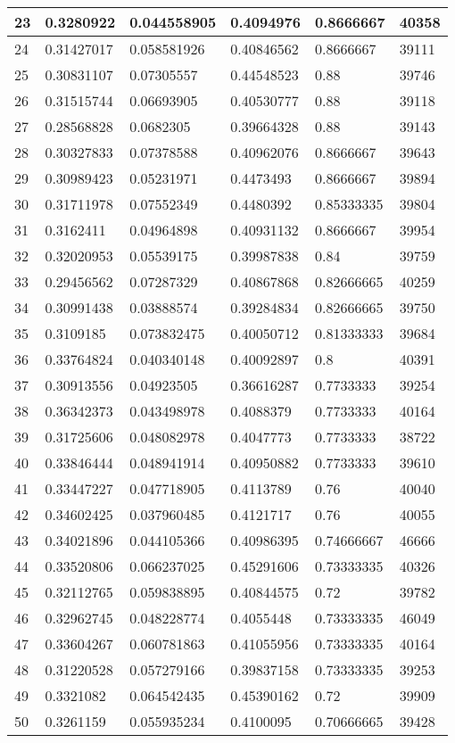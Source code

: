 \begin{longtable}{|l|l|l|l|l|l|}
23 & 0.3280922 & 0.044558905 & 0.4094976 & 0.8666667 & 40358 \\ \hline 
24 & 0.31427017 & 0.058581926 & 0.40846562 & 0.8666667 & 39111 \\ \hline 
25 & 0.30831107 & 0.07305557 & 0.44548523 & 0.88 & 39746 \\ \hline 
26 & 0.31515744 & 0.06693905 & 0.40530777 & 0.88 & 39118 \\ \hline 
27 & 0.28568828 & 0.0682305 & 0.39664328 & 0.88 & 39143 \\ \hline 
28 & 0.30327833 & 0.07378588 & 0.40962076 & 0.8666667 & 39643 \\ \hline 
29 & 0.30989423 & 0.05231971 & 0.4473493 & 0.8666667 & 39894 \\ \hline 
30 & 0.31711978 & 0.07552349 & 0.4480392 & 0.85333335 & 39804 \\ \hline 
31 & 0.3162411 & 0.04964898 & 0.40931132 & 0.8666667 & 39954 \\ \hline 
32 & 0.32020953 & 0.05539175 & 0.39987838 & 0.84 & 39759 \\ \hline 
33 & 0.29456562 & 0.07287329 & 0.40867868 & 0.82666665 & 40259 \\ \hline 
34 & 0.30991438 & 0.03888574 & 0.39284834 & 0.82666665 & 39750 \\ \hline 
35 & 0.3109185 & 0.073832475 & 0.40050712 & 0.81333333 & 39684 \\ \hline 
36 & 0.33764824 & 0.040340148 & 0.40092897 & 0.8 & 40391 \\ \hline 
37 & 0.30913556 & 0.04923505 & 0.36616287 & 0.7733333 & 39254 \\ \hline 
38 & 0.36342373 & 0.043498978 & 0.4088379 & 0.7733333 & 40164 \\ \hline 
39 & 0.31725606 & 0.048082978 & 0.4047773 & 0.7733333 & 38722 \\ \hline 
40 & 0.33846444 & 0.048941914 & 0.40950882 & 0.7733333 & 39610 \\ \hline 
41 & 0.33447227 & 0.047718905 & 0.4113789 & 0.76 & 40040 \\ \hline 
42 & 0.34602425 & 0.037960485 & 0.4121717 & 0.76 & 40055 \\ \hline 
43 & 0.34021896 & 0.044105366 & 0.40986395 & 0.74666667 & 46666 \\ \hline 
44 & 0.33520806 & 0.066237025 & 0.45291606 & 0.73333335 & 40326 \\ \hline 
45 & 0.32112765 & 0.059838895 & 0.40844575 & 0.72 & 39782 \\ \hline 
46 & 0.32962745 & 0.048228774 & 0.4055448 & 0.73333335 & 46049 \\ \hline 
47 & 0.33604267 & 0.060781863 & 0.41055956 & 0.73333335 & 40164 \\ \hline 
48 & 0.31220528 & 0.057279166 & 0.39837158 & 0.73333335 & 39253 \\ \hline 
49 & 0.3321082 & 0.064542435 & 0.45390162 & 0.72 & 39909 \\ \hline 
50 & 0.3261159 & 0.055935234 & 0.4100095 & 0.70666665 & 39428 \\ \hline 
\end{longtable}